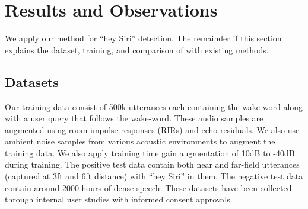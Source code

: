 \section{Results and Observations}
We apply our method for ``hey Siri'' detection. The remainder if this section explains the dataset, training, and comparison of \prjname with existing methods.



\subsection{Datasets}
Our training data consist of 500k utterances each containing the wake-word along with a user query that follows the wake-word. These audio samples are augmented using room-impulse responses (RIRs) and echo residuals. We also use ambient noise samples from various acoustic environments to augment the training data. We also apply training time gain augmentation of 10dB to -40dB during training. The positive test data contain both near and far-field utterances (captured at 3ft and 6ft distance) with ``hey Siri'' in them. The negative test data contain around 2000 hours of dense speech. These datasets have been collected through internal user studies with informed consent approvals.
